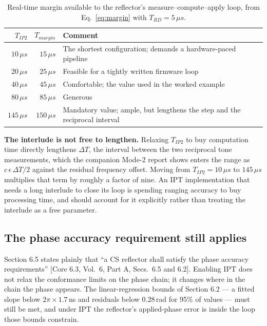 \documentclass[11pt,a4paper]{article}
\newcommand{\us}{\,\ensuremath{\upmu}s}
\newcommand{\IPT}{\ensuremath{\mathrm{IPT}}}
\newcommand{\Trd}{T_{RD}}
\newcommand{\Tiptwo}{T_{IP2}}
\providecommand{\upmu}{\mu}
\newcommand{\core}[1]{\textcolor{rulegrey}{\small[Core 6.3, #1]}}
\begin{document}
\begin{table}[h]
\caption{Real-time margin available to the reflector's measure--compute--apply loop, from
Eq.~\eqref{eq:margin} with $\Trd = 5\us$.}
\label{tab:margin}
\centering\small
\begin{tabular}{@{}rrL{74mm}@{}}
\toprule
$\Tiptwo$ & $T_{margin}$ & Comment \\
\midrule
$10\us$  & $15\us$  & The shortest configuration; demands a hardware-paced pipeline \\
$20\us$  & $25\us$  & Feasible for a tightly written firmware loop \\
$40\us$  & $45\us$  & Comfortable; the value used in the worked example \\
$80\us$  & $85\us$  & Generous \\
$145\us$ & $150\us$ & Mandatory value; ample, but lengthens the step and the reciprocal interval \\
\bottomrule
\end{tabular}
\end{table}

\begin{caution}
\textbf{The interlude is not free to lengthen.} Relaxing $\Tiptwo$ to buy computation time directly
lengthens $\Delta T$, the interval between the two reciprocal tone measurements, which the companion
Mode-2 report shows enters the range as $c\,\epsilon\,\Delta T/2$ against the residual frequency
offset. Moving from $\Tiptwo = 10\us$ to $145\us$ multiplies that term by roughly a factor of nine.
An \IPT{} implementation that needs a long interlude to close its loop is spending ranging accuracy
to buy processing time, and should account for it explicitly rather than treating the interlude as a
free parameter.
\end{caution}

\subsection{The phase accuracy requirement still applies}

Section 6.5 states plainly that ``a CS reflector shall satisfy the phase accuracy requirements''
\core{Vol.\ 6, Part A, Secs.\ 6.5 and 6.2}. Enabling \IPT{} does not relax the conformance limits on
the phase chain; it changes where in the chain the phase appears. The linear-regression bounds of
Section 6.2 --- a fitted slope below $2\pi\times1.7$\,ns and residuals below $0.28$\,rad for 95\% of
values --- must still be met, and under \IPT{} the reflector's applied-phase error is inside the loop
those bounds constrain.
\end{document}
